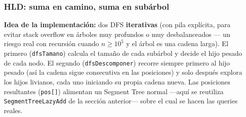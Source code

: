 \documentclass[10pt,a4paper,twocolumn]{article}
\begin{document}
\subsubsection{HLD: suma en camino, suma en subárbol}

\textbf{Idea de la implementación:} dos DFS \textbf{iterativas} (con
pila explícita, para evitar stack overflow en árboles muy profundos
o muy desbalanceados — un riesgo real con recursión cuando
$n\ge10^5$ y el árbol es una cadena larga). El primero
(\texttt{dfsTamano}) calcula el tamaño de cada subárbol y decide el
hijo pesado de cada nodo. El segundo (\texttt{dfsDescomponer})
recorre siempre primero al hijo pesado (así la cadena sigue
consecutiva en las posiciones) y solo después explora los hijos
livianos, cada uno iniciando su propia cadena nueva. Las posiciones
resultantes (\texttt{pos[]}) alimentan un Segment Tree normal —aquí
se reutiliza \texttt{SegmentTreeLazyAdd} de la sección anterior—
sobre el cual se hacen las queries reales.
\end{document}
